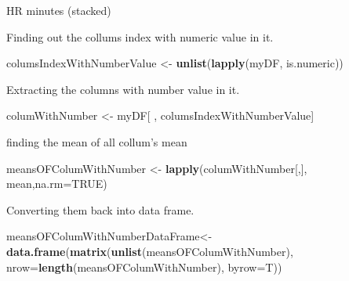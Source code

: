 \documentclass[]{book}
\newenvironment{Shaded}{\begin{snugshade}}{\end{snugshade}}
\newcommand{\KeywordTok}[1]{\textcolor[rgb]{0.13,0.29,0.53}{\textbf{#1}}}
\newcommand{\DataTypeTok}[1]{\textcolor[rgb]{0.13,0.29,0.53}{#1}}
\newcommand{\StringTok}[1]{\textcolor[rgb]{0.31,0.60,0.02}{#1}}
\newcommand{\OtherTok}[1]{\textcolor[rgb]{0.56,0.35,0.01}{#1}}
\newcommand{\OperatorTok}[1]{\textcolor[rgb]{0.81,0.36,0.00}{\textbf{#1}}}
\newcommand{\NormalTok}[1]{#1}
\begin{document}
HR minutes (stacked)

\begin{Shaded}
\end{Shaded}

Finding out the collums index with numeric value in it.

\begin{Shaded}
\begin{Highlighting}[]
\NormalTok{columsIndexWithNumberValue <-}\StringTok{ }\KeywordTok{unlist}\NormalTok{(}\KeywordTok{lapply}\NormalTok{(myDF, is.numeric)) }
\end{Highlighting}
\end{Shaded}

Extracting the columns with number value in it.

\begin{Shaded}
\begin{Highlighting}[]
\NormalTok{columWithNumber <-}\StringTok{ }\NormalTok{myDF[ , columsIndexWithNumberValue]}
\end{Highlighting}
\end{Shaded}

finding the mean of all collum's mean

\begin{Shaded}
\begin{Highlighting}[]
\NormalTok{meansOFColumWithNumber <-}\StringTok{ }\KeywordTok{lapply}\NormalTok{(columWithNumber[,], mean,}\DataTypeTok{na.rm=}\OtherTok{TRUE}\NormalTok{)}
\end{Highlighting}
\end{Shaded}

Converting them back into data frame.

\begin{Shaded}
\begin{Highlighting}[]
\NormalTok{meansOFColumWithNumberDataFrame<-}\KeywordTok{data.frame}\NormalTok{(}\KeywordTok{matrix}\NormalTok{(}\KeywordTok{unlist}\NormalTok{(meansOFColumWithNumber), }\DataTypeTok{nrow=}\KeywordTok{length}\NormalTok{(meansOFColumWithNumber), }\DataTypeTok{byrow=}\NormalTok{T))}
\end{Highlighting}
\end{Shaded}
\end{document}
